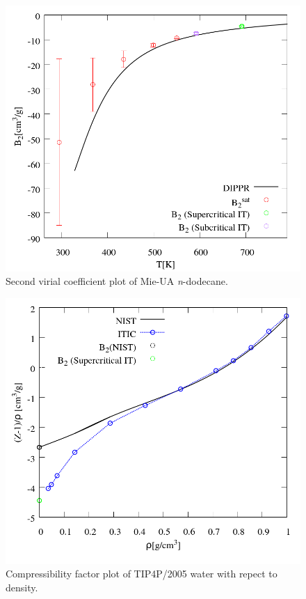 \documentclass[%
 aip,
 jcp,
 sd,%
 amsmath,amssymb,
]{revtex4-1}
\begin{document}
\begin{figure}[!htbp]
\includegraphics[scale=0.35]{Figures/EXAMPLE-SIM_Mie-C12_b2.png}
\caption{Second virial coefficient plot of Mie-UA \textit{n}-dodecane.}
\label{fig:EXAMPLE-SIM/Mie-C12/b2}
\end{figure}




\begin{figure}[!htbp]
\includegraphics[scale=0.35]{Figures/EXAMPLE-SIM_TIP4P05_zrho.png}
\caption{Compressibility factor plot of TIP4P/2005 water with repect to density. }
\label{fig:EXAMPLE-SIM/TIP4P05/zrho}
\end{figure}
\end{document}

